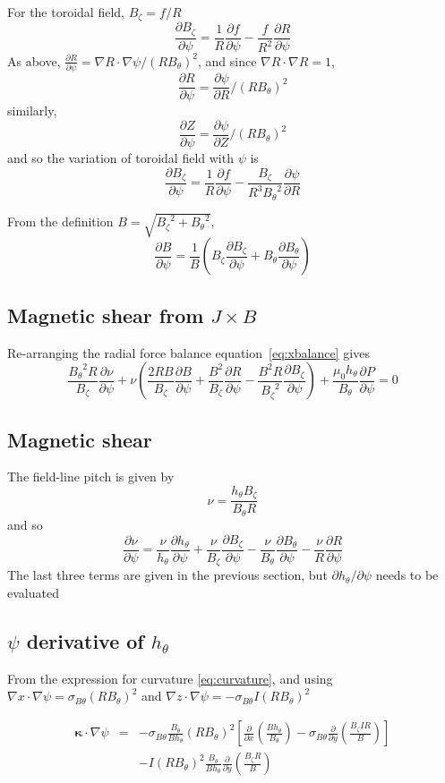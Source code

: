 \documentclass[12pt, a4paper]{article}
\newcommand{\deriv}[2]{\ensuremath{\frac{\partial #1}{\partial #2}}}
\newcommand{\hthe}{\ensuremath{h_\theta}}
\newcommand{\Bp}{\ensuremath{B_\theta}}
\newcommand{\Bt}{\ensuremath{B_\zeta}}
\newcommand{\Vec}[1]{\ensuremath{\mathbf{#1}}}
\newcommand{\kvec}{\Vec{\kappa}}
\newcommand{\rbp}{\ensuremath{R\Bp}}
\newcommand{\rbpsq}{\ensuremath{\left(\rbp\right)^2}}
\newcommand{\sbp}{\ensuremath{\sigma_{B\theta}}}
\begin{document}
For the toroidal field, $\Bt = f/R$
\[
\deriv{\Bt}{\psi} = \frac{1}{R}\deriv{f}{\psi} - \frac{f}{R^2}\deriv{R}{\psi}
\]
As above, $\deriv{R}{\psi} = \nabla R \cdot\nabla\psi / \left(R\Bp\right)^2$,
and since $\nabla R\cdot\nabla R = 1$,
\[
\deriv{R}{\psi} = \deriv{\psi}{R} / \left(R\Bp\right)^2
\]
similarly,
\[
\deriv{Z}{\psi} = \deriv{\psi}{Z} / \left(R\Bp\right)^2
\]
and so the variation of toroidal field with $\psi$ is
\[
\deriv{\Bt}{\psi} = \frac{1}{R}\deriv{f}{\psi} - \frac{\Bt}{R^3\Bp^2}\deriv{\psi}{R}
\]

From the definition $B=\sqrt{\Bt^2 + \Bp^2}$, 
\[
\deriv{B}{\psi} = \frac{1}{B}\left(\Bt\deriv{\Bt}{\psi} + \Bp\deriv{\Bp}{\psi}\right)
\]

\subsection{Magnetic shear from $J\times B$}

Re-arranging the radial force balance equation~\ref{eq:xbalance} gives
\[
\frac{\Bp^2R}{\Bt}\deriv{\nu}{\psi} + \nu\left(\frac{2RB}{\Bt}\deriv{B}{\psi} + \frac{B^2}{\Bt}\deriv{R}{\psi} - \frac{B^2R}{\Bt^2}\deriv{\Bt}{\psi}\right) + \frac{\mu_0\hthe}{\Bp}\deriv{P}{\psi} = 0
\]

\subsection{Magnetic shear}

The field-line pitch is given by
\[
\nu = \frac{\hthe\Bt}{\Bp R}
\]
and so
\[
\deriv{\nu}{\psi} = \frac{\nu}{\hthe}\deriv{\hthe}{\psi} + \frac{\nu}{\Bt}\deriv{\Bt}{\psi} - \frac{\nu}{\Bp}\deriv{\Bp}{\psi} - \frac{\nu}{R}\deriv{R}{\psi}
\]
The last three terms are given in the previous section, but $\partial\hthe/\partial\psi$ needs to be evaluated

\subsection{$\psi$ derivative of $\hthe$}

From the expression for curvature \ref{eq:curvature}, and using $\nabla x \cdot \nabla \psi = \sbp \left(R\Bp\right)^2$ and $\nabla z\cdot\nabla \psi = -\sbp I \left(R\Bp\right)^2$

\begin{eqnarray*}
\kvec\cdot\nabla\psi &=& -\sbp \frac{\Bp}{B\hthe}\rbpsq\left[\deriv{}{x}\left(\frac{B\hthe}{\Bp}\right) - \sbp\deriv{}{y}\left(\frac{\Bt IR}{B}\right)\right] \\
&&- I\rbpsq \frac{\Bp}{B\hthe}\deriv{}{y}\left(\frac{\Bt R}{B}\right)
\end{eqnarray*}
\end{document}
